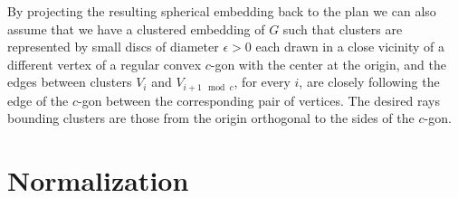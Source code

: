 \documentclass{llncs}
\begin{document}
By projecting the resulting spherical embedding back to the plan we can also assume that we have a clustered embedding of $G$
such that clusters are represented by small discs of diameter $\epsilon>0$ each drawn in a close vicinity
of a different vertex of a regular convex $c$-gon with the center at the origin, and the edges
between clusters $V_i$ and $V_{i+1 \mod c}$, for every $i$, are closely following the edge
of the $c$-gon between the corresponding pair of vertices. 
The desired rays bounding clusters are those from the origin orthogonal to the sides of the $c$-gon. \\


\section*{Normalization}
\end{document}
